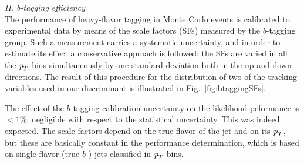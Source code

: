 
\vspace{3mm}
{\em II. b-tagging efficiency} %
\\[3mm]
The performance of heavy-flavor tagging in Monte Carlo events is calibrated to experimental data by means of the scale factors (SFs) measured by the $b$-tagging group. %
Such a measurement carries a systematic uncertainty, and in order to estimate its effect a conservative approach is followed: %
the SFs are varied in all the ${\emph{p}_{T}}$ bins simultaneously by one standard deviation both in the up and down directions. The result of this procedure for the distribution of two of the tracking variables used in our discriminant is illustrated in Fig.~\ref{fig:btaggingSFs}. 

The effect of the $b$-tagging calibration uncertainty on the likelihood peformance is $< 1$\%, negligible with respect to the statistical uncertainty.
This was indeed expected. The scale factors depend on the true flavor of the jet and on its ${\emph{p}_{T}}$, but these are basically constant in the performance determination, which is based on single flavor (true $b$-) jets classified in ${\emph{p}_{T}}$-bins.

